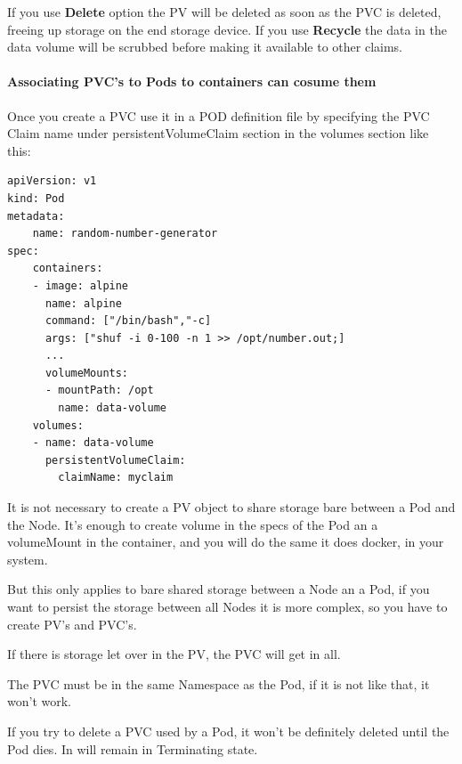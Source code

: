 \documentclass{article}
\newenvironment{blocktemplateIII}[1]{%
    \tcolorbox[beamer,%
    noparskip,breakable,
    ,colframe=Red,%
    colbacklower=LimeGreen!75!LightGreen,%
    title=#1]}%
    {\endtcolorbox}
\newenvironment{codetemplate}[1][]{%
  \mybasecolorbox[#1]
  \itshape
}{%
  \endmybasecolorbox
}
\begin{document}
If you use \textbf{Delete} option the PV will be deleted as soon as the PVC is deleted, freeing up storage on the end storage device. If you use \textbf{Recycle} the data in the data volume will be scrubbed before making it available to other claims.

\paragraph{Associating PVC's to Pods to containers can cosume them}

Once you create a PVC use it in a POD definition file by specifying the PVC Claim name under persistentVolumeClaim section in the volumes section like this:

\begin{codetemplate}{}
\begin{verbatim}
apiVersion: v1
kind: Pod
metadata:
    name: random-number-generator
spec:
    containers:
    - image: alpine
      name: alpine
      command: ["/bin/bash","-c]
      args: ["shuf -i 0-100 -n 1 >> /opt/number.out;]
      ...
      volumeMounts:
      - mountPath: /opt
        name: data-volume
    volumes:
    - name: data-volume
      persistentVolumeClaim:
        claimName: myclaim
\end{verbatim}
\end{codetemplate}

\begin{blocktemplateIII}{WARNING}
It is not necessary to create a PV object to share storage bare between a Pod and the Node. It's enough to create volume in the specs of the Pod an a volumeMount in the container, and you will do the same it does docker, in your system. 

But this only applies to bare shared storage between a Node an a Pod, if you want to persist the storage between all Nodes it is more complex, so you have to create PV's and PVC's.
\end{blocktemplateIII}

\begin{blocktemplateIII}{WARNING}
If there is storage let over in the PV, the PVC will get in all.
\end{blocktemplateIII}

\begin{blocktemplateIII}{WARNING}
The PVC must be in the same Namespace as the Pod, if it is not like that, it won't work.
\end{blocktemplateIII}

\begin{blocktemplateIII}{WARNING}
If you try to delete a PVC used by a Pod, it won't be definitely deleted until the Pod dies. In will remain in Terminating state.
\end{blocktemplateIII}
\end{document}
